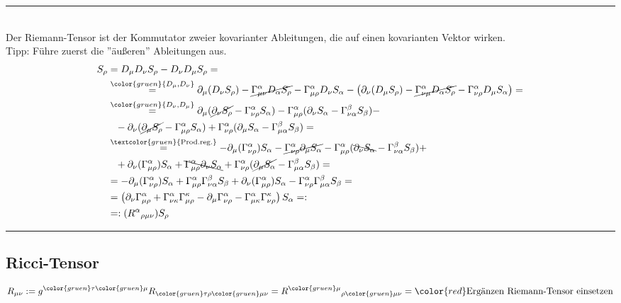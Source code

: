 \documentclass{article}
\newcommand{\lr}[1]{\left(#1\right)}
\newcommand{\commenttext}[1]{\textcolor{gruen}{\text{#1}}}
\newcommand{\comment}[1]{{\color{gruen} {#1}}}
\begin{document}
{\color{violet}
\hrule
	\\
	Der Riemann-Tensor ist der Kommutator zweier kovarianter Ableitungen, die auf einen kovarianten Vektor wirken.\\
	Tipp: Führe zuerst die ''äußeren'' Ableitungen aus.
		\begin{align*}
			[D_\mu,D_\nu] S_\rho &= D_\mu D_\nu S_\rho - D_\nu D_\mu S_\rho = \\
			&\stackrel{\comment{D_\mu,D_\nu}}{=} \partial_\mu (D_\nu S_\rho) - \cancel{\Gamma^\alpha_{\mu\nu} D_\alpha S_\rho} - \Gamma^\alpha_{\mu\rho} D_\nu S_\alpha - \lr{ \partial_\nu (D_\mu S_\rho) - \cancel{\Gamma^\alpha_{\nu\mu} D_\alpha S_\rho} - \Gamma^\alpha_{\nu\rho} D_\mu S_\alpha } = \\
			&\stackrel{\comment{D_\nu,D_\mu}}{=} \partial_\mu (\cancel{\partial_\nu S_\rho} - \Gamma^\alpha_{\nu\rho} S_\alpha) - \Gamma^\alpha_{\mu\rho} (\partial_\nu S_\alpha - \Gamma^\beta_{\nu\alpha} S_\beta) - \\
			&\phantom{=} - \partial_\nu (\cancel{\partial_\mu S_\rho} - \Gamma^\alpha_{\mu\rho}S_\alpha) + \Gamma^\alpha_{\nu\rho} (\partial_\mu S_\alpha - \Gamma^\beta_{\mu\alpha} S_\beta) = \\
			&\stackrel{\commenttext{Prod.reg.}}{=} -\partial_\mu (\Gamma^\alpha_{\nu\rho}) S_\alpha - \cancel{\Gamma^\alpha_{\nu\rho} \partial_\mu S_\alpha} - \Gamma^\alpha_{\mu\rho} (\bcancel{\partial_\nu S_\alpha} - \Gamma^\beta_{\nu\alpha} S_\beta) + \\
			&\phantom{=} + \partial_\nu (\Gamma^\alpha_{\mu\rho}) S_\alpha + \bcancel{\Gamma^\alpha_{\mu\rho} \partial_\nu S_\alpha} + \Gamma^\alpha_{\nu\rho} (\cancel{\partial_\mu S_\alpha} - \Gamma^\beta_{\mu\alpha} S_\beta) = \\
			&= -\partial_\mu(\Gamma^\alpha_{\nu\rho})S_\alpha + \Gamma^\alpha_{\mu\rho}\Gamma^\beta_{\nu\alpha} S_\beta + \partial_\nu (\Gamma^\alpha_{\mu\rho}) S_\alpha - \Gamma^\alpha_{\nu\rho}\Gamma^\beta_{\mu\alpha} S_\beta = \\
			&= \lr{ \partial_\nu \Gamma^\alpha_{\mu\rho} + \Gamma^\alpha_{\nu\kappa}\Gamma^\kappa_{\mu\rho} - \partial_\mu\Gamma^\alpha_{\nu\rho} - \Gamma^\alpha_{\mu\kappa}\Gamma^\kappa_{\nu\rho} } S_\alpha =: \\
			&=: (R^\alpha{}_{\rho\mu\nu}) S_\rho
		\end{align*}
\hrule
}




\subsection{Ricci-Tensor}
	\begin{equation}
		R_{\mu\nu} := g^{{\color{gruen}\tau}{\color{gruen}\mu}} R_{{\color{gruen}\tau}\rho{\color{gruen}\mu}\nu} = R^{\color{gruen}\mu}{}_{\rho{\color{gruen}\mu}\nu} = {\color{red}\text{Ergänzen Riemann-Tensor einsetzen}}
	\end{equation}
\end{document}
